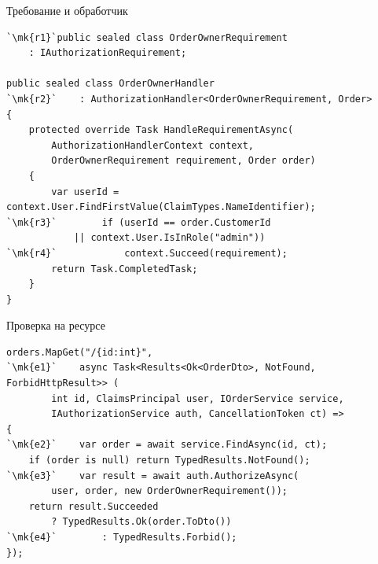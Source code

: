 \documentclass[aspectratio=169,10pt,t]{beamer}
\newcommand{\codexs}{\ttfamily\fontsize{7.0}{8.3}\selectfont}
\newcommand{\mk}[1]{\tikz[remember picture,overlay]\coordinate (#1) at (0,0.55ex);}
\begin{document}
\begin{frame}[fragile]{Требование и обработчик}
  \vspace{0.3em}
\begin{lstlisting}[style=csharp,basicstyle=\codexs,escapechar=`]
`\mk{r1}`public sealed class OrderOwnerRequirement
    : IAuthorizationRequirement;

public sealed class OrderOwnerHandler
`\mk{r2}`    : AuthorizationHandler<OrderOwnerRequirement, Order>
{
    protected override Task HandleRequirementAsync(
        AuthorizationHandlerContext context,
        OrderOwnerRequirement requirement, Order order)
    {
        var userId = context.User.FindFirstValue(ClaimTypes.NameIdentifier);
`\mk{r3}`        if (userId == order.CustomerId
            || context.User.IsInRole("admin"))
`\mk{r4}`            context.Succeed(requirement);
        return Task.CompletedTask;
    }
}
\end{lstlisting}
\end{frame}

\begin{frame}[fragile]{Проверка на ресурсе}
  \vspace{0.3em}
\begin{lstlisting}[style=csharp,basicstyle=\codexs,escapechar=`]
orders.MapGet("/{id:int}",
`\mk{e1}`    async Task<Results<Ok<OrderDto>, NotFound, ForbidHttpResult>> (
        int id, ClaimsPrincipal user, IOrderService service,
        IAuthorizationService auth, CancellationToken ct) =>
{
`\mk{e2}`    var order = await service.FindAsync(id, ct);
    if (order is null) return TypedResults.NotFound();
`\mk{e3}`    var result = await auth.AuthorizeAsync(
        user, order, new OrderOwnerRequirement());
    return result.Succeeded
        ? TypedResults.Ok(order.ToDto())
`\mk{e4}`        : TypedResults.Forbid();
});
\end{lstlisting}

  \slidegap
\end{frame}
\end{document}

